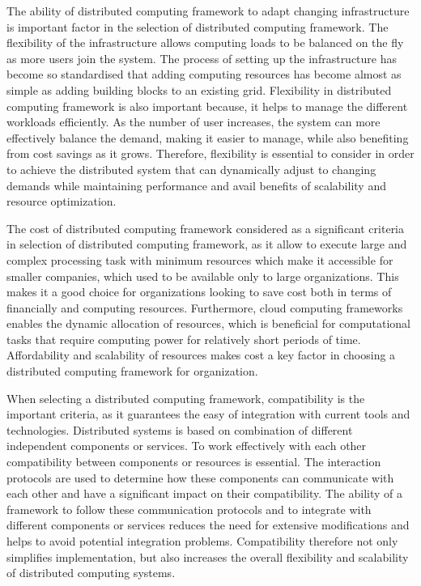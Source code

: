The ability of distributed computing framework to adapt changing infrastructure is important factor in the selection of distributed computing framework. The flexibility of the infrastructure allows computing loads to be balanced on the fly as more users join the system. The process of setting up the infrastructure has become so standardised that adding computing resources has become almost as simple as adding building blocks to an existing grid. Flexibility in distributed computing framework is also important because, it helps to manage the different workloads efficiently. As the number of user increases, the system can more effectively balance the demand, making it easier to manage, while also benefiting from cost savings as it grows. Therefore, flexibility is essential to consider in order to achieve the distributed system that can dynamically adjust to changing demands while maintaining performance and avail benefits of scalability and resource optimization. \cite{avram2014advantages}

The cost of distributed computing framework considered as a significant criteria in selection of distributed computing framework, as it allow to execute large and complex processing task with minimum resources which make it accessible for smaller companies, which used to be available only to large organizations. This makes it a good choice for organizations looking to save cost both in terms of financially and computing resources. Furthermore, cloud computing frameworks enables the dynamic allocation of resources, which is beneficial for computational tasks that require computing power for relatively short periods of time. Affordability and scalability of resources makes cost a key factor in choosing a distributed computing framework for organization. \cite{avram2014advantages}

When selecting a distributed computing framework, compatibility is the important criteria, as it guarantees the easy of integration with current tools and technologies. Distributed systems is based on combination of different independent components or services. To work effectively with each other compatibility between components or resources is essential. The interaction protocols are used to determine how these components can communicate with each other and have a significant impact on their compatibility. The ability of a framework to follow these communication protocols and to integrate with different components or services reduces the need for extensive modifications and helps to avoid potential integration problems. Compatibility therefore not only simplifies implementation, but also increases the overall flexibility and scalability of distributed computing systems. \cite{chevrou2019modular}

